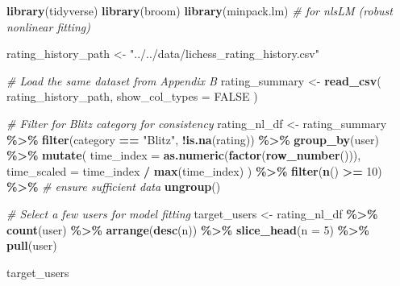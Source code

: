 \documentclass[
]{article}
\newenvironment{Shaded}{\begin{snugshade}}{\end{snugshade}}
\newcommand{\AttributeTok}[1]{\textcolor[rgb]{0.13,0.29,0.53}{#1}}
\newcommand{\CommentTok}[1]{\textcolor[rgb]{0.56,0.35,0.01}{\textit{#1}}}
\newcommand{\ConstantTok}[1]{\textcolor[rgb]{0.56,0.35,0.01}{#1}}
\newcommand{\DecValTok}[1]{\textcolor[rgb]{0.00,0.00,0.81}{#1}}
\newcommand{\FunctionTok}[1]{\textcolor[rgb]{0.13,0.29,0.53}{\textbf{#1}}}
\newcommand{\NormalTok}[1]{#1}
\newcommand{\OtherTok}[1]{\textcolor[rgb]{0.56,0.35,0.01}{#1}}
\newcommand{\SpecialCharTok}[1]{\textcolor[rgb]{0.81,0.36,0.00}{\textbf{#1}}}
\newcommand{\StringTok}[1]{\textcolor[rgb]{0.31,0.60,0.02}{#1}}
\begin{document}
\begin{Shaded}
\begin{Highlighting}[]
\FunctionTok{library}\NormalTok{(tidyverse)}
\FunctionTok{library}\NormalTok{(broom)}
\FunctionTok{library}\NormalTok{(minpack.lm) }\CommentTok{\# for nlsLM (robust nonlinear fitting)}

\NormalTok{rating\_history\_path }\OtherTok{\textless{}{-}} \StringTok{"../../data/lichess\_rating\_history.csv"}

\CommentTok{\# Load the same dataset from Appendix B}
\NormalTok{rating\_summary }\OtherTok{\textless{}{-}} \FunctionTok{read\_csv}\NormalTok{(}
\NormalTok{  rating\_history\_path,}
  \AttributeTok{show\_col\_types =} \ConstantTok{FALSE}
\NormalTok{)}

\CommentTok{\# Filter for Blitz category for consistency}
\NormalTok{rating\_nl\_df }\OtherTok{\textless{}{-}}\NormalTok{ rating\_summary }\SpecialCharTok{\%\textgreater{}\%}
  \FunctionTok{filter}\NormalTok{(category }\SpecialCharTok{==} \StringTok{"Blitz"}\NormalTok{, }\SpecialCharTok{!}\FunctionTok{is.na}\NormalTok{(rating)) }\SpecialCharTok{\%\textgreater{}\%}
  \FunctionTok{group\_by}\NormalTok{(user) }\SpecialCharTok{\%\textgreater{}\%}
  \FunctionTok{mutate}\NormalTok{(}
    \AttributeTok{time\_index =} \FunctionTok{as.numeric}\NormalTok{(}\FunctionTok{factor}\NormalTok{(}\FunctionTok{row\_number}\NormalTok{())),}
    \AttributeTok{time\_scaled =}\NormalTok{ time\_index }\SpecialCharTok{/} \FunctionTok{max}\NormalTok{(time\_index)}
\NormalTok{  ) }\SpecialCharTok{\%\textgreater{}\%}
  \FunctionTok{filter}\NormalTok{(}\FunctionTok{n}\NormalTok{() }\SpecialCharTok{\textgreater{}=} \DecValTok{10}\NormalTok{) }\SpecialCharTok{\%\textgreater{}\%} \CommentTok{\# ensure sufficient data}
  \FunctionTok{ungroup}\NormalTok{()}

\CommentTok{\# Select a few users for model fitting}
\NormalTok{target\_users }\OtherTok{\textless{}{-}}\NormalTok{ rating\_nl\_df }\SpecialCharTok{\%\textgreater{}\%}
  \FunctionTok{count}\NormalTok{(user) }\SpecialCharTok{\%\textgreater{}\%}
  \FunctionTok{arrange}\NormalTok{(}\FunctionTok{desc}\NormalTok{(n)) }\SpecialCharTok{\%\textgreater{}\%}
  \FunctionTok{slice\_head}\NormalTok{(}\AttributeTok{n =} \DecValTok{5}\NormalTok{) }\SpecialCharTok{\%\textgreater{}\%}
  \FunctionTok{pull}\NormalTok{(user)}

\NormalTok{target\_users}
\end{Highlighting}
\end{Shaded}
\end{document}
